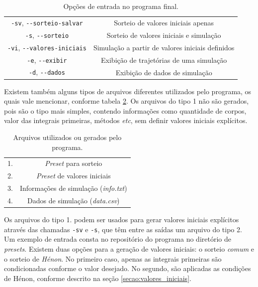 \begin{table}
    \centering
    \begin{tabular}{c|c}
        \hline\hline
         \verb|-sv|, \verb|--sorteio-salvar|   & Sorteio de valores iniciais apenas \\
         \verb|-s|, \verb|--sorteio|           & Sorteio de valores iniciais e simulação \\
         \verb|-vi|, \verb|--valores-iniciais| & Simulação a partir de valores iniciais definidos \\
         \verb|-e|, \verb|--exibir|            & Exibição de trajetórias de uma simulação \\
         \verb|-d|, \verb|--dados|             & Exibição de dados de simulação \\
         \hline\hline
    \end{tabular}
    \caption{Opções de entrada no programa final.}
    \label{tabela:opcoes_entrada}
\end{table}

Existem também alguns tipos de arquivos diferentes utilizados pelo programa, os quais vale mencionar, conforme tabela \ref{tabela:arquivos_gerados}. Os arquivos do tipo 1 não são gerados, pois são o tipo mais simples, contendo informações como quantidade de corpos, valor das integrais primeiras, métodos \textit{etc}, sem definir valores iniciais explícitos.

\begin{table}
    \centering
    \begin{tabular}{c|c}
        \hline\hline
         1. & \textit{Preset} para sorteio \\
         2. & \textit{Preset} de valores iniciais \\
         3. & Informações de simulação (\textit{info.txt}) \\
         4. & Dados de simulação (\textit{data.csv}) \\
         \hline\hline
    \end{tabular}
    \caption{Arquivos utilizados ou gerados pelo programa.}
    \label{tabela:arquivos_gerados}
\end{table}

Os arquivos do tipo 1. podem ser usados para gerar valores iniciais explícitos através das chamadas \verb|-sv| e \verb|-s|, que têm entre as saídas um arquivo do tipo 2. Um exemplo de entrada consta no repositório do programa no diretório de \textit{presets}. Existem duas opções para a geração de valores iniciais: o sorteio \textit{comum} e o sorteio de \textit{Hénon}. No primeiro caso, apenas as integrais primeiras são condicionadas conforme o valor desejado. No segundo, são aplicadas as condições de Hénon, conforme descrito na seção \ref{secao:valores_iniciais}.

